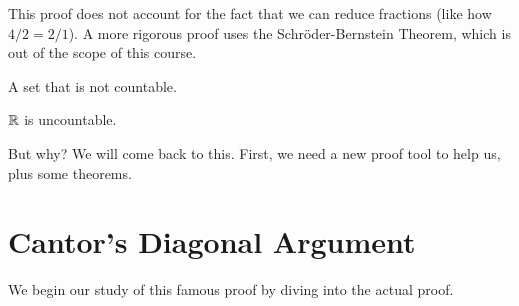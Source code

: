 \documentclass[main.tex]{subfiles}
\begin{document}
\begin{rem}
	This proof does not account for the fact that we can reduce fractions (like how \(4/2 = 2/1\)). A more rigorous proof uses the Schr\"{o}der-Bernstein Theorem, which is out of the scope of this course.
\end{rem}

\begin{defn}
	A set that is not countable.
\end{defn}

\begin{example}
	\(\mathbb{R}\) is uncountable.
\end{example}

But why? We will come back to this. First, we need a new proof tool to help us, plus some theorems.

\section{Cantor's Diagonal Argument}

We begin our study of this famous proof by diving into the actual proof.
\end{document}

